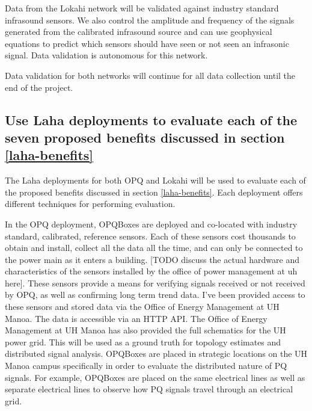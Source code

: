 Data from the Lokahi network will be validated against industry standard infrasound sensors. We also control the amplitude and frequency of the signals generated from the calibrated infrasound source and can use geophysical equations to predict which sensors should have seen or not seen an infrasonic signal. Data validation is autonomous for this network.

Data validation for both networks will continue for all data collection until the end of the project.

\subsection{Use Laha deployments to evaluate each of the seven proposed benefits discussed in section \ref{laha-benefits}}
The Laha deployments for both OPQ and Lokahi will be used to evaluate each of the proposed benefits discussed in section \ref{laha-benefits}. Each deployment offers different techniques for performing evaluation. 

In the OPQ deployment, OPQBoxes are deployed and co-located with industry standard, calibrated, reference sensors. Each of these sensors cost thousands to obtain and install, collect all the data all the time, and can only be connected to the power main as it enters a building. [TODO discuss the actual hardware and characteristics of the sensors installed by the office of power management at uh here]. These sensors provide a means for verifying signals received or not received by OPQ, as well as confirming long term trend data. I've been provided access to these sensors and stored data via the Office of Energy Management at UH Manoa. The data is accessible via an HTTP API. The Office of Energy Management at UH Manoa has also provided the full schematics for the UH power grid. This will be used as a ground truth for topology estimates and distributed signal analysis. OPQBoxes are placed in strategic locations on the UH Manoa campus specifically in order to evaluate the distributed nature of PQ signals. For example, OPQBoxes are placed on the same electrical lines as well as separate electrical lines to observe how PQ signals travel through an electrical grid.

